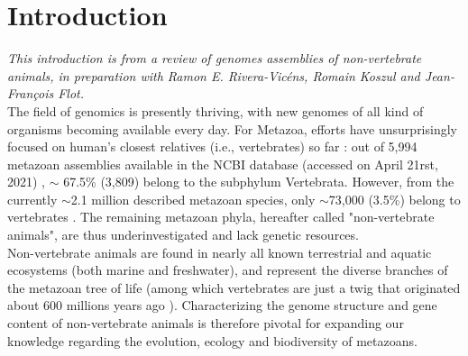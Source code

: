 
\chapter{Introduction}

\textit{This introduction is from a review of genomes assemblies of non-vertebrate animals, in preparation with Ramon E. Rivera-Vicéns, Romain Koszul and Jean-François Flot.} \\

The field of genomics is presently thriving, with new genomes of all kind of organisms becoming available every day. For Metazoa, efforts have unsurprisingly focused on human's closest relatives (i.e., vertebrates) so far \cite{rice2019}: out of 5,994 metazoan assemblies available in the NCBI database (accessed on April 21rst, 2021) \cite{ncbi}, $\sim$ 67.5\% (3,809) belong to the subphylum Vertebrata. However, from the currently $\sim$2.1 million described metazoan species, only $\sim$73,000 (3.5\%) belong to vertebrates \cite{red_list}. The remaining metazoan phyla, hereafter called "non-vertebrate animals", are thus underinvestigated and lack genetic resources. \\ 

Non-vertebrate animals are found in nearly all known terrestrial and aquatic ecosystems (both marine and freshwater), and represent the diverse branches of the metazoan tree of life (among which vertebrates are just a twig that originated about 600 millions years ago \cite{timetree}). Characterizing the genome structure and gene content of non-vertebrate animals is therefore pivotal for expanding our knowledge regarding the evolution, ecology and biodiversity of metazoans. \\

